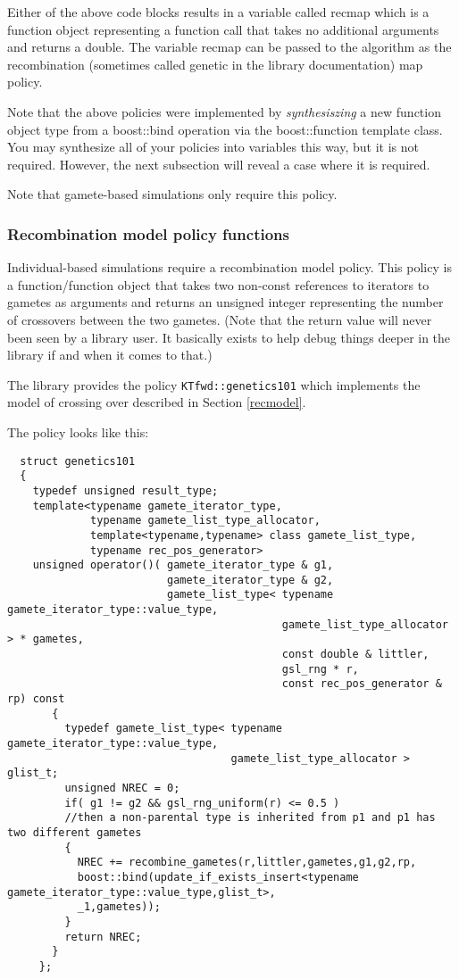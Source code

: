 \documentclass{article}
\begin{document}
Either of the above code blocks results in a variable called recmap which is a function object representing a function call that takes no additional arguments and returns a double.  The variable recmap can be passed to the algorithm as the recombination (sometimes called genetic in the library documentation) map policy.

Note that the above policies were implemented by \textit{synthesiszing} a new function object type from a boost::bind operation via the boost::function template class.  You may synthesize all of your policies into variables this way, but it is not required.  However, the next subsection will reveal a case where it is required.

Note that gamete-based simulations only require this policy.

\subsubsection{Recombination model policy functions}
Individual-based simulations require a recombination model policy.  This policy is a function/function object that takes two non-const references to iterators to gametes as arguments and returns an unsigned integer representing the number of crossovers between the two gametes.  (Note that the return value will never been seen by a library user.  It basically exists to help debug things deeper in the library if and when it comes to that.)  

The library provides the policy \texttt{KTfwd::genetics101} which implements the model of crossing over described in Section \ref{recmodel}.  

The policy looks like this:
\begin{lstlisting}
  struct genetics101
  {
    typedef unsigned result_type;
    template<typename gamete_iterator_type,
             typename gamete_list_type_allocator,
             template<typename,typename> class gamete_list_type,
             typename rec_pos_generator>
    unsigned operator()( gamete_iterator_type & g1,
                         gamete_iterator_type & g2,
                         gamete_list_type< typename gamete_iterator_type::value_type,
                                           gamete_list_type_allocator > * gametes,
                                           const double & littler,
                                           gsl_rng * r,
                                           const rec_pos_generator & rp) const
       {
         typedef gamete_list_type< typename gamete_iterator_type::value_type, 
                                   gamete_list_type_allocator > glist_t;
         unsigned NREC = 0;
         if( g1 != g2 && gsl_rng_uniform(r) <= 0.5 )
         //then a non-parental type is inherited from p1 and p1 has two different gametes                                    
         {
           NREC += recombine_gametes(r,littler,gametes,g1,g2,rp,
           boost::bind(update_if_exists_insert<typename gamete_iterator_type::value_type,glist_t>,
           _1,gametes));
         }
         return NREC;
       }
     };
\end{lstlisting}
\end{document}
